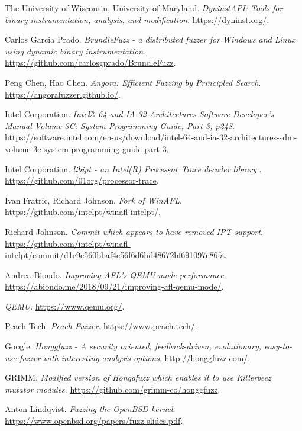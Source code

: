\begin{thebibliography}{99}
  The University of Wisconsin, University of Maryland.
  \textit{DyninstAPI: Tools for binary instrumentation, analysis, and modification}.
  \url{https://dyninst.org/}.

  Carlos Garcia Prado.
  \textit{BrundleFuzz - a distributed fuzzer for Windows and Linux using dynamic binary instrumentation}.
  \url{https://github.com/carlosgprado/BrundleFuzz}.

  Peng Chen, Hao Chen.
  \textit{Angora: Efficient Fuzzing by Principled Search}.
  \url{https://angorafuzzer.github.io/}.

  Intel Corporation.
  \textit{Intel® 64 and IA-32 Architectures Software Developer's Manual Volume 3C: System Programming Guide, Part 3, p248}.
  \url{https://software.intel.com/en-us/download/intel-64-and-ia-32-architectures-sdm-volume-3c-system-programming-guide-part-3}.

  Intel Corporation.
  \textit{libipt - an Intel(R) Processor Trace decoder library }.
  \url{https://github.com/01org/processor-trace}.

  Ivan Fratric, Richard Johnson.
  \textit{Fork of WinAFL}.
  \url{https://github.com/intelpt/winafl-intelpt/}.

  Richard Johnson.
  \textit{Commit which appears to have removed IPT support}.
  \url{https://github.com/intelpt/winafl-intelpt/commit/d1e9e560bbaf4e56f6d6bd48672bf691097e86fa}.

  Andrea Biondo.
  \textit{Improving AFL's QEMU mode performance}.
  \url{https://abiondo.me/2018/09/21/improving-afl-qemu-mode/}.

  \textit{QEMU}.
  \url{https://www.qemu.org/}.

  Peach Tech.
  \textit{Peach Fuzzer}.
  \url{https://www.peach.tech/}.

  Google.
  \textit{Honggfuzz - A security oriented, feedback-driven, evolutionary, easy-to-use fuzzer with interesting analysis options}.
  \url{http://honggfuzz.com/}.

  GRIMM.
  \textit{Modified version of Honggfuzz which enables it to use Killerbeez mutator modules}.
  \url{https://github.com/grimm-co/honggfuzz}.

  Anton Lindqvist.
  \textit{Fuzzing the OpenBSD kernel}.
  \url{https://www.openbsd.org/papers/fuzz-slides.pdf}.


\end{thebibliography}
